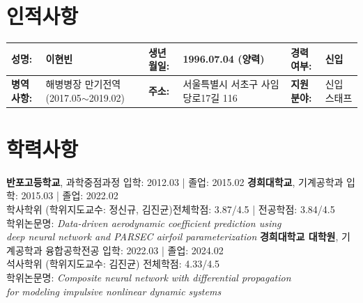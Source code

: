 \documentclass[a4paper,10pt]{extarticle}
\begin{document}
\renewcommand*{\arraystretch}{1.5}
\noindent
\section*{인적사항}
\begin{center}
    \vspace*{-0.8cm}
    \noindent
    \begin{longtable}{LRLRLR}
        \textbf{성명:}   & 이현빈                                      & \textbf{생년월일:} & 1996.07.04 (양력)       & \textbf{경력여부:} & 신입       \\
        \hline
        \textbf{병역사항:} & 해병병장 만기전역 \small{(2017.05$\sim$2019.02)} & \textbf{주소:}   & 서울특별시 서초구 사임당로17길 116 & \textbf{지원분야:} & {신입 스태프} \\
        \hline
    \end{longtable}
\end{center}




\section*{학력사항}
\noindent
\textbf{반포고등학교}, 과학중점과정 \hfill 입학: 2012.03 | 졸업: 2015.02
\newline
\textbf{경희대학교}, 기계공학과 \hfill 입학: 2015.03 | 졸업: 2022.02\\ %
학사학위 (학위지도교수: 정신규, 김진균)\hfill 전체학점: 3.87/4.5 | 전공학점: 3.84/4.5\\ %
학위논문명: \textit{\small{Data-driven aerodynamic coefficient prediction using}}\\
\hspace*{1.9cm}\textit{\small{deep neural
        network and PARSEC airfoil parameterization}}
\newline
\textbf{경희대학교 대학원}, 기계공학과 융합공학전공 \hfill 입학: 2022.03 | 졸업: 2024.02\\ %
석사학위 (학위지도교수: 김진균) \hfill 전체학점: 4.33/4.5\\ %
학위논문명: \textit{\small{Composite neural network with differential propagation}}\\
\hspace*{1.9cm}\textit{\small{for modeling impulsive nonlinear dynamic systems}}
\end{document}
